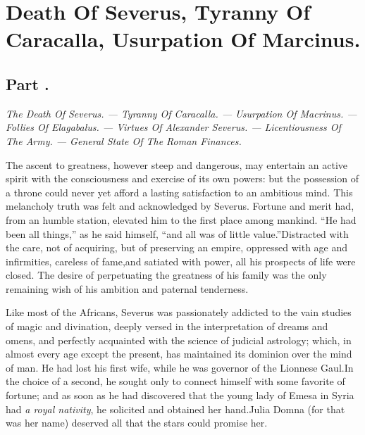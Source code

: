 \chapter{Death Of Severus, Tyranny Of Caracalla, Usurpation Of Marcinus.}
\section{Part \thesection.}

\textit{The Death Of Severus. — Tyranny Of Caracalla. — Usurpation Of
Macrinus. — Follies Of Elagabalus. — Virtues Of Alexander
Severus. — Licentiousness Of The Army. — General State Of The Roman
Finances.}
\vspace{\onelineskip}

The ascent to greatness, however steep and dangerous, may
entertain an active spirit with the consciousness and exercise of
its own powers: but the possession of a throne could never yet
afford a lasting satisfaction to an ambitious mind. This
melancholy truth was felt and acknowledged by Severus. Fortune
and merit had, from an humble station, elevated him to the first
place among mankind. “He had been all things,” as he said
himself, “and all was of little value.”\footnotemark[1] Distracted with the
care, not of acquiring, but of preserving an empire, oppressed
with age and infirmities, careless of fame,\footnotemark[2] and satiated with
power, all his prospects of life were closed. The desire of
perpetuating the greatness of his family was the only remaining
wish of his ambition and paternal tenderness.



Like most of the Africans, Severus was passionately addicted to
the vain studies of magic and divination, deeply versed in the
interpretation of dreams and omens, and perfectly acquainted with
the science of judicial astrology; which, in almost every age
except the present, has maintained its dominion over the mind of
man. He had lost his first wife, while he was governor of the
Lionnese Gaul.\footnotemark[3] In the choice of a second, he sought only to
connect himself with some favorite of fortune; and as soon as he
had discovered that the young lady of Emesa in Syria had \textit{a royal
nativity}, he solicited and obtained her hand.\footnotemark[4] Julia Domna (for
that was her name) deserved all that the stars could promise her.


